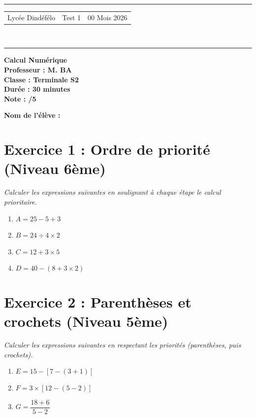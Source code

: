\documentclass[a4paper,12pt]{article}
\begin{document}
\hrule
\begin{center}
    \begin{tabular}{@{} p{5cm} p{5cm} p{5cm} @{}} 
        Lycée Dindéfélo & \quad\quad Test 1 & 00 Mois 2026 \\
    \end{tabular}
    \\[-0.01cm]
    \hrule
\end{center}

\begin{center}
    \textbf{\Large Calcul Numérique} \\[0.2cm]
    \textbf{\large Professeur : M. BA} \\[0.2cm]
    \textbf{Classe : Terminale S2} \\[0.2cm]
    \textbf{\small Durée : 30 minutes}\\[0.2cm]
    \textbf{\small Note : \quad /5}
\end{center}

\textbf{\small Nom de l'élève :} \underline{\hspace{8cm}} \\[0.7cm]

\section*{Exercice 1 : Ordre de priorité (Niveau 6ème)}
\textit{Calculer les expressions suivantes en soulignant à chaque étape le calcul prioritaire.}

\begin{enumerate}
    \item $A = 25 - 5 + 3$
    \item $B = 24 \div 4 \times 2$
    \item $C = 12 + 3 \times 5$
    \item $D = 40 - (8 + 3 \times 2)$
\end{enumerate}

\vspace{1cm}

\section*{Exercice 2 : Parenthèses et crochets (Niveau 5ème)}
\textit{Calculer les expressions suivantes en respectant les priorités (parenthèses, puis crochets).}

\begin{enumerate}
    \item $E = 15 - [7 - (3 + 1)]$
    \item $F = 3 \times [12 - (5 - 2)]$
    \item $G = \dfrac{18 + 6}{5 - 2}$
\end{enumerate}
\end{document}
